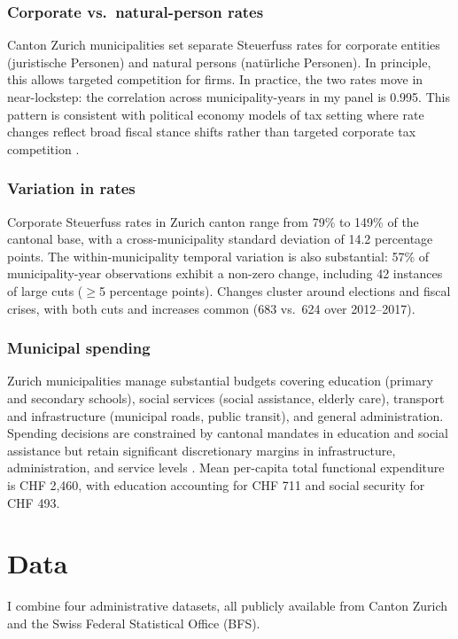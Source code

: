 \documentclass[12pt]{article}
\begin{document}
\subsubsection*{Corporate vs.\ natural-person rates} Canton Zurich municipalities set separate Steuerfuss rates for corporate entities (juristische Personen) and natural persons (natürliche Personen). In principle, this allows targeted competition for firms. In practice, the two rates move in near-lockstep: the correlation across municipality-years in my panel is 0.995. This pattern is consistent with political economy models of tax setting where rate changes reflect broad fiscal stance shifts rather than targeted corporate tax competition \citep{haufler2001taxation}.

\subsubsection*{Variation in rates} Corporate Steuerfuss rates in Zurich canton range from 79\% to 149\% of the cantonal base, with a cross-municipality standard deviation of 14.2 percentage points. The within-municipality temporal variation is also substantial: 57\% of municipality-year observations exhibit a non-zero change, including 42 instances of large cuts ($\geq$5 percentage points). Changes cluster around elections and fiscal crises, with both cuts and increases common (683 vs.\ 624 over 2012--2017).

\subsubsection*{Municipal spending} Zurich municipalities manage substantial budgets covering education (primary and secondary schools), social services (social assistance, elderly care), transport and infrastructure (municipal roads, public transit), and general administration. Spending decisions are constrained by cantonal mandates in education and social assistance but retain significant discretionary margins in infrastructure, administration, and service levels \citep{ladner2013gemeinden}. Mean per-capita total functional expenditure is CHF 2,460, with education accounting for CHF 711 and social security for CHF 493.


\section{Data}
\label{sec:data}

I combine four administrative datasets, all publicly available from Canton Zurich and the Swiss Federal Statistical Office (BFS).
\end{document}
